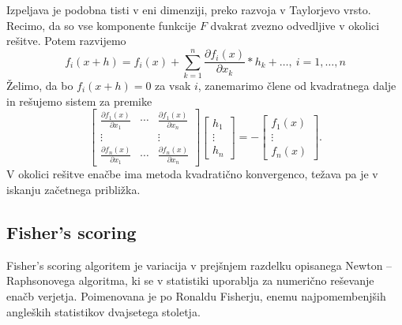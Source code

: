 \documentclass[12pt,a4paper]{amsart}
\theoremstyle{definition} %
\theoremstyle{plain} %
\begin{document}
Izpeljava je podobna tisti v eni dimenziji, preko razvoja v Taylorjevo vrsto. Recimo, da so vse komponente funkcije $F$ dvakrat zvezno odvedljive v okolici rešitve. Potem razvijemo
\[
    f_{i}(x+h) = f_{i}(x) + \sum_{k=1}^{n} \frac{\partial f_{i}(x)}{\partial x_{k}}*h_{k} + \ldots,~i=1,\ldots,n
\]
Želimo, da bo $f_{i}(x+h) = 0$ za vsak $i$, zanemarimo člene od kvadratnega dalje in rešujemo sistem za premike
\[
    \begin{bmatrix}
        \frac{\partial f_{1}(x)}{\partial x_{1}} & \cdots & \frac{\partial f_{1}(x)}{\partial x_{n}} \\
        \vdots & & \vdots \\
        \frac{\partial f_{n}(x)}{\partial x_{1}} & \cdots & \frac{\partial f_{n}(x)}{\partial x_{n}}
    \end{bmatrix}
    \begin{bmatrix}
        h_{1} \\
        \vdots\\
        h_{n}
    \end{bmatrix} 
    = -
    \begin{bmatrix}
       f_{1}(x) \\
       \vdots \\
       f_{n}(x)
    \end{bmatrix}.
\]
V okolici rešitve enačbe ima metoda kvadratično konvergenco, težava pa je v iskanju začetnega približka.
\subsection{Fisher's scoring}
Fisher's scoring algoritem je variacija v prejšnjem razdelku opisanega Newton -- Raphsonovega algoritma, ki se v statistiki uporablja za numerično reševanje enačb 
verjetja. Poimenovana je po Ronaldu Fisherju, enemu najpomembenjših angleških statistikov dvajsetega stoletja.
\end{document}
